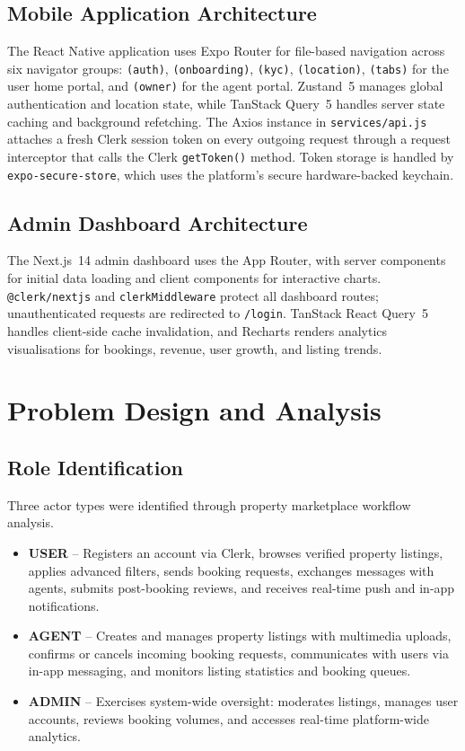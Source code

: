 \documentclass[12pt,a4paper]{report}
\begin{document}
\subsection{Mobile Application Architecture}

The React Native application uses Expo Router for file-based navigation across six
navigator groups: \texttt{(auth)}, \texttt{(onboarding)}, \texttt{(kyc)},
\texttt{(location)}, \texttt{(tabs)} for the user home portal, and \texttt{(owner)} for
the agent portal. Zustand~5 manages global authentication and location state, while
TanStack Query~5 handles server state caching and background refetching. The Axios
instance in \texttt{services/api.js} attaches a fresh Clerk session token on every
outgoing request through a request interceptor that calls the Clerk \texttt{getToken()}
method. Token storage is handled by \texttt{expo-secure-store}, which uses the
platform's secure hardware-backed keychain.

\subsection{Admin Dashboard Architecture}

The Next.js~14 admin dashboard uses the App Router, with server components for initial
data loading and client components for interactive charts. \texttt{@clerk/nextjs} and
\texttt{clerkMiddleware} protect all dashboard routes; unauthenticated requests are
redirected to \texttt{/login}. TanStack React Query~5 handles client-side cache
invalidation, and Recharts renders analytics visualisations for bookings, revenue, user
growth, and listing trends.

\section{Problem Design and Analysis}

\subsection{Role Identification}

Three actor types were identified through property marketplace workflow analysis.

\begin{itemize}[noitemsep]
  \item \textbf{USER} -- Registers an account via Clerk, browses verified property
        listings, applies advanced filters, sends booking requests, exchanges messages with
        agents, submits post-booking reviews, and receives real-time push and in-app
        notifications.
  \item \textbf{AGENT} -- Creates and manages property listings with multimedia uploads,
        confirms or cancels incoming booking requests, communicates with users via in-app
        messaging, and monitors listing statistics and booking queues.
  \item \textbf{ADMIN} -- Exercises system-wide oversight: moderates listings, manages
        user accounts, reviews booking volumes, and accesses real-time platform-wide
        analytics.
\end{itemize}
\end{document}
